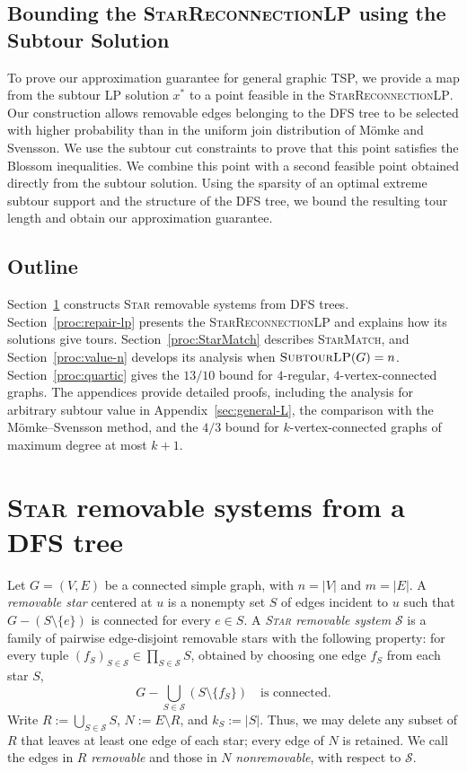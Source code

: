 \documentclass[11pt]{amsart}
\newcommand{\1}{\mathbbm{1}}
\newcommand{\ALG}{\textsc{StarMatch}}
\newcommand{\SubtourLP}{\textsc{SubtourLP}}
\newcommand{\LPtwo}{\textsc{StarReconnectionLP}}
\begin{document}
\subsection{Bounding the \LPtwo{} using the Subtour Solution}

To prove our approximation guarantee for general graphic TSP,
we provide a map from the subtour LP solution $x^*$ to a point feasible in the \LPtwo. Our construction allows removable edges
belonging to the DFS tree to be selected with higher probability than in the uniform join distribution of M\"omke and Svensson.  We use the subtour cut constraints to prove that this point satisfies the Blossom inequalities. We combine this point with a second feasible point obtained directly from the subtour solution. Using the sparsity of an optimal extreme subtour support and the structure of the DFS tree, we bound the resulting tour length and obtain our approximation guarantee.







\subsection{Outline}
Section~\ref{proc:systems} constructs \textsc{Star} removable
systems from DFS trees. Section~\ref{proc:repair-lp} presents
the \LPtwo{} and explains how its solutions give tours.
Section~\ref{proc:StarMatch} describes \ALG{}, and
Section~\ref{proc:value-n} develops its analysis when
$\SubtourLP(G)=n$. Section~\ref{proc:quartic} gives the
$13/10$ bound for $4$-regular, $4$-vertex-connected graphs.
The appendices provide detailed proofs, including the
analysis for arbitrary subtour value in
Appendix~\ref{sec:general-L}, the comparison with the
M\"omke--Svensson method, and the $4/3$ bound for
$k$-vertex-connected graphs of maximum degree at most $k+1$. 
\section{\textsc{Star} removable systems from a DFS tree}
\label{proc:systems}

Let $G=(V,E)$ be a connected simple graph, with $n=|V|$ and
$m=|E|$. A \emph{removable star} centered at $u$ is a nonempty
set $S$ of edges incident to $u$ such that $G-(S\setminus\{e\})$
is connected for every $e\in S$. A \emph{\textsc{Star} removable system}
$\mathcal S$ is a family of pairwise edge-disjoint removable
stars with the following property: for every tuple
$(f_S)_{S\in\mathcal S}\in\prod_{S\in\mathcal S}S$, obtained by
choosing one edge $f_S$ from each star $S$,
\[
 G-\bigcup_{S\in\mathcal S}(S\setminus\{f_S\})
 \quad\text{is connected}.
\]
Write $R:=\bigcup_{S\in\mathcal S}S$, $N:=E\setminus R$, and
$k_S:=|S|$. Thus, we may delete any subset of $R$ that leaves
at least one edge of each star; every edge of $N$ is retained. We call the edges in $R$ \emph{removable} and those in $N$
\emph{nonremovable}, with respect to $\mathcal S$.
\end{document}
